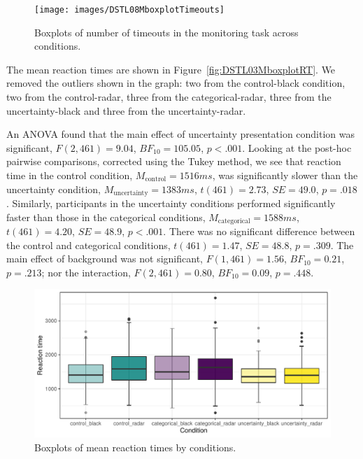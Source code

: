 \documentclass[doc, a4paper, apacite]{apa6}
\begin{document}
\begin{figure}[ht!]
	\centering
	\texttt{[image: images/DSTL08MboxplotTimeouts]}
	\caption{Boxplots of number of timeouts in the monitoring task across conditions.}
	\label{fig:DSTL08MboxplotTimeouts}
\end{figure}

The mean reaction times are shown in Figure~\ref{fig:DSTL03MboxplotRT}. 
We removed the outliers shown in the graph: two from the control-black condition, two from the control-radar, three from the categorical-radar, three from the uncertainty-black and three from the uncertainty-radar.  

An ANOVA found that the main effect of uncertainty presentation condition was significant, $F(2, 461)= 9.04$, $BF_{10}=105.05$, $p<.001$. 
Looking at the post-hoc pairwise comparisons, corrected using the Tukey method, we see that reaction time in the control condition, $M_\text{control}=1516ms$, was significantly slower than the uncertainty condition, $M_\text{uncertainty}=1383ms$, $t(461)=2.73$, $SE=49.0$, $p=.018$.
Similarly,  participants in the uncertainty conditions performed significantly faster than those in the categorical conditions, $M_\text{categorical}=1588ms$, $t(461)=4.20$, $SE=48.9$, $p<.001$. 
There was no significant difference between the control and categorical conditions,  $t(461)=1.47$, $SE=48.8$, $p=.309$. 
The main effect of background was not significant, $F(1, 461)=1.56$, $BF_{10}=0.21$, $p=.213$; 
nor the interaction, $F(2, 461)=0.80$, $BF_{10}=0.09$, $p=.448$. 

\begin{figure}[bh!]
	\centering	
	\includegraphics[width=\textwidth]{images/DSTL08MboxplotRT}
	\caption{Boxplots of mean reaction times by conditions.}
	\label{fig:DSTL08MboxplotRT}
\end{figure}

\clearpage
\newpage


\end{document}
